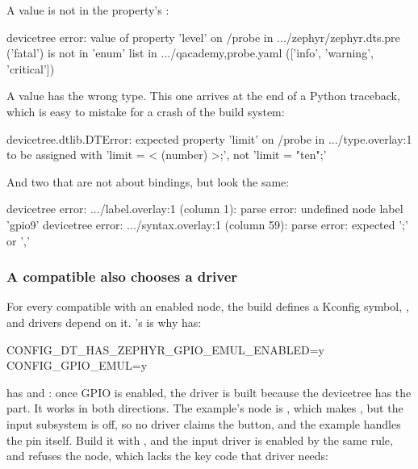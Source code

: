 A value is not in the property’s :

\begin{console}
devicetree error: value of property 'level' on /probe in .../zephyr/zephyr.dts.pre ('fatal') is not in 'enum' list in .../qacademy,probe.yaml (['info', 'warning', 'critical'])
\end{console}

A value has the wrong type. This one arrives at the end of a Python traceback, which is easy to
mistake for a crash of the build system:

\begin{console}
devicetree.dtlib.DTError: expected property 'limit' on /probe in .../type.overlay:1 to be assigned with 'limit = < (number) >;', not 'limit = "ten";'
\end{console}

\noindent And two that are not about bindings, but look the same:

\begin{console}
devicetree error: .../label.overlay:1 (column 1): parse error: undefined node label 'gpio9'
devicetree error: .../syntax.overlay:1 (column 59): parse error: expected ';' or ','
\end{console}

\subsubsection{A compatible also chooses a driver}
For every compatible with an enabled node, the build defines a Kconfig symbol,
, and drivers depend on it. ’s  is
why  has:

\begin{kconfigcode}
CONFIG_DT_HAS_ZEPHYR_GPIO_EMUL_ENABLED=y
CONFIG_GPIO_EMUL=y
\end{kconfigcode}

 has  and :
once GPIO is enabled, the driver is built because the devicetree has the part. It works in both
directions. The  example’s  node is
, which makes , but the input
subsystem is off, so no driver claims the button, and the example handles the pin itself. Build it
with , and the  input driver is enabled by the same rule, and
refuses the node, which lacks the key code that driver needs:

